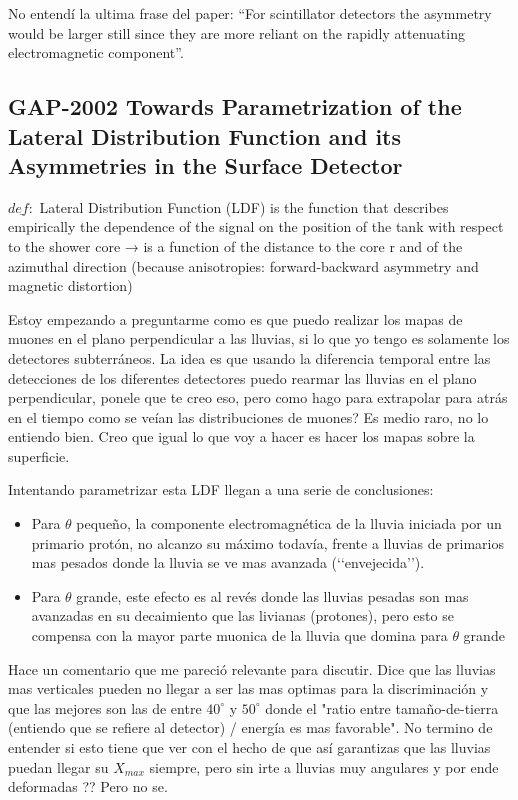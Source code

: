 No entendí la ultima frase del paper: “For scintillator detectors the asymmetry would be larger still since they are more reliant on the rapidly attenuating electromagnetic component”.


\subsection{GAP-2002 Towards Parametrization of the Lateral Distribution Function and its Asymmetries in the Surface Detector\cite{paper_2002}}


$\underline{def:}$ Lateral Distribution Function (LDF) is the function that describes empirically the dependence of the signal on the position of the tank with respect to the shower core → is a function of the distance to the core r and of the azimuthal direction (because anisotropies: forward-backward asymmetry and magnetic distortion)

Estoy empezando a preguntarme como es que puedo realizar los mapas de muones en el plano perpendicular a las lluvias, si lo que yo tengo es solamente los detectores subterráneos. La idea es que usando la diferencia temporal entre las detecciones de los diferentes detectores puedo rearmar las lluvias en el plano perpendicular, ponele que te creo eso, pero como hago para extrapolar para atrás en el tiempo como se veían las distribuciones de muones? Es medio raro, no lo entiendo bien. Creo que igual lo que voy a hacer es hacer los mapas sobre la superficie.

Intentando parametrizar esta LDF llegan a una serie de conclusiones:

\begin{itemize}
    \item Para $\theta$ pequeño, la componente electromagnética de la lluvia iniciada por un primario protón, no alcanzo su máximo todavía, frente a lluvias de primarios mas pesados donde la lluvia se ve mas avanzada (‘‘envejecida’’).
    \item Para $\theta$ grande, este efecto es al revés donde las lluvias pesadas son mas avanzadas en su decaimiento que las livianas (protones), pero esto se compensa con la mayor parte muonica de la lluvia que domina para $\theta$ grande
\end{itemize}

Hace un comentario que me pareció relevante para discutir. Dice que las lluvias mas verticales pueden no llegar a ser las mas optimas para la discriminación y que las mejores son las de entre $40^\circ$ y $50^\circ$ donde el "ratio entre tamaño-de-tierra (entiendo que se refiere al detector) / energía es mas favorable". No termino de entender si esto tiene que ver con el hecho de que así   garantizas que las lluvias puedan llegar su $X_{max}$ siempre, pero sin irte a lluvias muy angulares y por ende deformadas ?? Pero no se.

